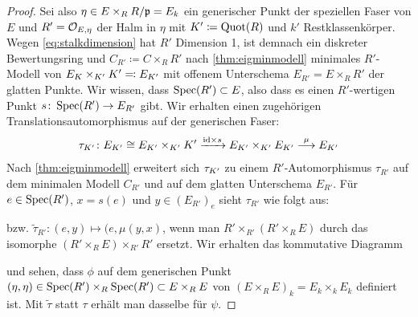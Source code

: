 \begin{Lemma}
\begin{proof}
    Sei also $\eta\in E\times_R R/\mathfrak{p}=E_k$ ein generischer Punkt der
    speziellen Faser von $E$ und $R'=\mathcal{O}_{E,\eta}$ der Halm in
    $\eta$ mit $K'\coloneqq\operatorname{Quot}(R)$ und $k'$
    Restklassenkörper. Wegen \ref{eq:stalkdimension} hat $R'$
    Dimension 1, ist demnach ein diskreter Bewertungsring und
    $C_{R'}\coloneqq C\times_R R'$ nach \ref{thm:eigminmodell}
    minimales $R'$-Modell von $E_{K}\times_{K'}K'\eqqcolon E_{K'}$
    mit offenem Unterschema $E_{R'}=E\times_R R'$ der glatten Punkte.
    Wir wissen, dass $\operatorname{Spec}(R')\subset E$, also dass es
    einen $R'$-wertigen Punkt $s\colon\operatorname{Spec}(R')\to E_{R'}$ gibt.
    Wir erhalten einen zugehörigen Translationsautomorphismus auf der
    generischen Faser:
    \begin{gather*}
      \tau_{K'}\colon
      E_{K'}\cong E_{K'}\times_{K'}K'
      \xrightarrow{\mathrm{id}\times s}
      E_{K'}\times_{K'}E_{K'}
      \overset{\mu}{\longrightarrow}
      E_{K'}
    \end{gather*}
    Nach \ref{thm:eigminmodell} erweitert sich $\tau_{K'}$ zu
    einem $R'$-Automorphismus $\tau_{R'}$ auf dem minimalen Modell
    $C_{R'}$ und auf dem glatten Unterschema $E_{R'}$.
    Für $e\in\operatorname{Spec}(R')$, $x=s(e)$ und $y\in(E_{R'})_e$ sieht $\tau_{R'}$
    wie folgt aus:
    \begin{center}
    \end{center}
    bzw. $\tilde\tau_{R'}\colon(e,y)\mapsto(e,\mu(y,x)$, wenn man
    $R'\times_{R'}(R'\times_R E)$ durch das isomorphe $(R'\times_R
    E)\times_{R'}R'$ ersetzt.
    Wir erhalten das kommutative Diagramm
    \begin{center}
    \end{center}
    und sehen, dass $\phi$ auf dem generischen Punkt
    $(\eta,\eta)\in\operatorname{Spec}(R')\times_R\operatorname{Spec}(R')\subset E\times_R E$
    von $(E\times_R E)_k=E_k\times_k E_k$ definiert ist.
    Mit $\tilde\tau$ statt $\tau$ erhält man dasselbe für $\psi$.

\end{proof}
\end{Lemma}
